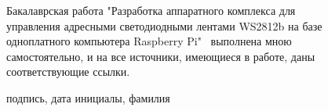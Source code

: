 \newpage 

\begin{figure}

Бакалаврская работа "Разработка аппаратного комплекса для управления адресными светодиодными лентами WS2812b на базе одноплатного компьютера Raspberry Pi" \ выполнена мною самостоятельно, и на все источники, имеющиеся в работе, даны соответствующие ссылки.

\end{figure}

\begin{figure}
\begin{flushright}
\underline{\hspace{4cm}}  \quad  \underline{\hspace{4cm}} 

 \scriptsize подпись, дата     \quad     \qquad  \qquad  \qquad        \scriptsize инициалы, фамилия  \qquad  \qquad  \qquad 
\end{flushright}
\end{figure}